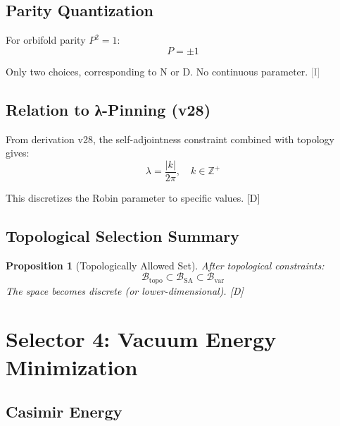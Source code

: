\documentclass[11pt,a4paper]{article}
\newtheorem{proposition}[theorem]{Proposition}
\newcommand{\tagD}{\textcolor{blue!70!black}{[D]}}
\newcommand{\tagI}{\textcolor{gray}{[I]}}
\begin{document}
\subsection{Parity Quantization}

For orbifold parity $P^2 = 1$:
\begin{equation}
\label{eq:parity-quant}
P = \pm 1
\end{equation}

Only two choices, corresponding to N or D. No continuous parameter. \tagI

\subsection{Relation to λ-Pinning (v28)}

From derivation v28, the self-adjointness constraint combined with topology gives:
\begin{equation}
\label{eq:lambda-pin}
\lambda = \frac{|k|}{2\pi}, \quad k \in \mathbb{Z}^+
\end{equation}

This discretizes the Robin parameter to specific values. \tagD

\subsection{Topological Selection Summary}

\begin{proposition}[Topologically Allowed Set]
\label{prop:topo-allowed}
After topological constraints:
\begin{equation}
\label{eq:topo-allowed}
\mathcal{B}_{\text{topo}} \subset \mathcal{B}_{\text{SA}} \subset \mathcal{B}_{\text{var}}
\end{equation}
The space becomes discrete (or lower-dimensional). \tagD
\end{proposition}

\section{Selector 4: Vacuum Energy Minimization}

\subsection{Casimir Energy}
\end{document}
